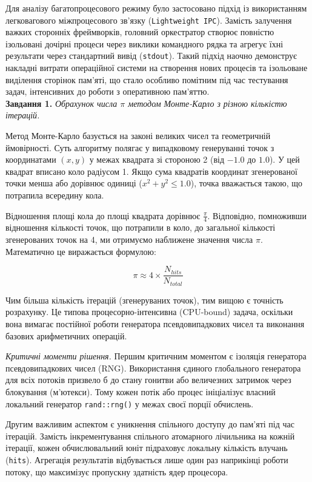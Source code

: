 \documentclass[14pt, a4paper]{extreport}
\begin{document}
	Для аналізу багатопроцесового режиму було застосовано підхід із використанням легковагового міжпроцесового зв'язку (\texttt{Lightweight IPC}). Замість залучення важких сторонніх фреймворків, головний оркестратор створює повністю ізольовані дочірні процеси через виклики командного рядка та агрегує їхні результати через стандартний вивід (\texttt{stdout}). Такий підхід наочно демонструє накладні витрати операційної системи на створення нових процесів та ізольоване виділення сторінок пам'яті, що стало особливо помітним під час тестування задач, інтенсивних до роботи з оперативною пам'яттю. \\
	
	\textbf{Завдання 1.} \textit{Обрахунок числа $\pi$ методом Монте-Карло з різною кількістю ітерацій.}
	
	Метод Монте-Карло базується на законі великих чисел та геометричній ймовірності. Суть алгоритму полягає у випадковому генеруванні точок з координатами $(x, y)$ у межах квадрата зі стороною 2 (від $-1.0$ до $1.0$). У цей квадрат вписано коло радіусом 1. Якщо сума квадратів координат згенерованої точки менша або дорівнює одиниці ($x^2 + y^2 \le 1.0$), точка вважається такою, що потрапила всередину кола. 
	
	Відношення площі кола до площі квадрата дорівнює $\frac{\pi}{4}$. Відповідно, помноживши відношення кількості точок, що потрапили в коло, до загальної кількості згенерованих точок на 4, ми отримуємо наближене значення числа $\pi$. Математично це виражається формулою:
	
	$$ \pi \approx 4 \times \frac{N_{hits}}{N_{total}} $$
	
	Чим більша кількість ітерацій (згенеруваних точок), тим вищою є точність розрахунку. Це типова процесорно-інтенсивна (CPU-bound) задача, оскільки вона вимагає постійної роботи генератора псевдовипадкових чисел та виконання базових арифметичних операцій.
	
	\textit{Критичні моменти рішення.}
	Першим критичним моментом є ізоляція генератора псевдовипадкових чисел (RNG). Використання єдиного глобального генератора для всіх потоків призвело б до стану гонитви або величезних затримок через блокування (м'ютекси). Тому кожен потік або процес ініціалізує власний локальний генератор \texttt{rand::rng()} у межах своєї порції обчислень.
	
	Другим важливим аспектом є уникнення спільного доступу до пам'яті під час ітерацій. Замість інкрементування спільного атомарного лічильника на кожній ітерації, кожен обчислювальний юніт підраховує локальну кількість влучань (\texttt{hits}). Агрегація результатів відбувається лише один раз наприкінці роботи потоку, що максимізує пропускну здатність ядер процесора.
	
\end{document}
